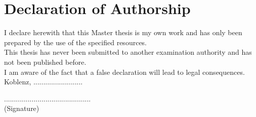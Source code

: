 \chapter{Declaration of Authorship} \label{chap:chapter_9}\begin{center}
\vspace{2cm}
\end{center}

\begin{flushleft}
I declare herewith that this Master thesis is my own work and has only been prepared by the use of the specified resources.
\vspace{1cm} \\

This thesis has never been submitted to another examination authority and has not been published before.
\vspace{1cm} \\
I am aware of the fact that a false declaration will lead to legal consequences.
\vspace{1cm}
\\
Koblenz, .........................
\vspace{4cm}
\end{flushleft}

\begin{center}
    ............................................ \\
    
    (Signature)

\end{center}
